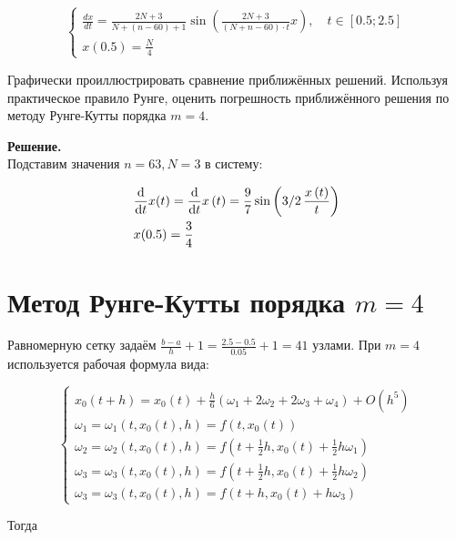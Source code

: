 \documentclass[14pt,a4paper]{scrartcl}
\begin{document}
\begin{equation*}
	\left\{\begin{array}{l}
	\frac{d x}{d t}=\frac{2 N+3}{N+(n-60)+1} \sin \left(\frac{2 N+3}{(N+n-60) \cdot t} x\right), \quad t \in[0.5 ; 2.5] \\
	x(0.5)=\frac{N}{4}
	\end{array}\right.
\end{equation*}

Графически проиллюстрировать сравнение приближённых решений. Используя практическое правило Рунге, оценить погрешность приближённого решения по методу Рунге-Кутты порядка $m=4$.

\textbf{Решение.}\\

Подставим значения $n = 63, N = 3$ в систему:

\begin{align*}
	&\dv{t}x(t) = {\frac {\rm d}{{\rm d}t}}x \left( t \right) ={\frac {9}{7}\sin \left( 
		3/2\,{\frac {x \left( t \right) }{t}} \right) }	\\
	&x(0.5) = \frac{3}{4}
\end{align*}


\section{Метод Рунге-Кутты порядка $m=4$}

Равномерную сетку задаём $\frac{b-a}{h}+1 = \frac{2.5-0.5}{0.05} + 1 = 41$ узлами. При $m = 4$ используется рабочая формула вида:

\begin{equation*}
	\left\{\begin{array}{l}
	x_{0}(t+h)=x_{0}(t)+\frac{h}{6}\left(\omega_{1}+2 \omega_{2}+2 \omega_{3}+\omega_{4}\right)+O\left(h^{5}\right) \\
	\omega_{1}=\omega_{1}\left(t, x_{0}(t), h\right)=f\left(t, x_{0}(t)\right) \\
	\omega_{2}=\omega_{2}\left(t, x_{0}(t), h\right)=f\left(t+\frac{1}{2} h, x_{0}(t)+\frac{1}{2} h \omega_{1}\right) \\
	\omega_{3}=\omega_{3}\left(t, x_{0}(t), h\right)=f\left(t+\frac{1}{2} h, x_{0}(t)+\frac{1}{2} h \omega_{2}\right) \\
	\omega_{3}=\omega_{3}\left(t, x_{0}(t), h\right)=f\left(t+h, x_{0}(t)+h \omega_{3}\right)
	\end{array}\right.
\end{equation*}

Тогда
\end{document}
